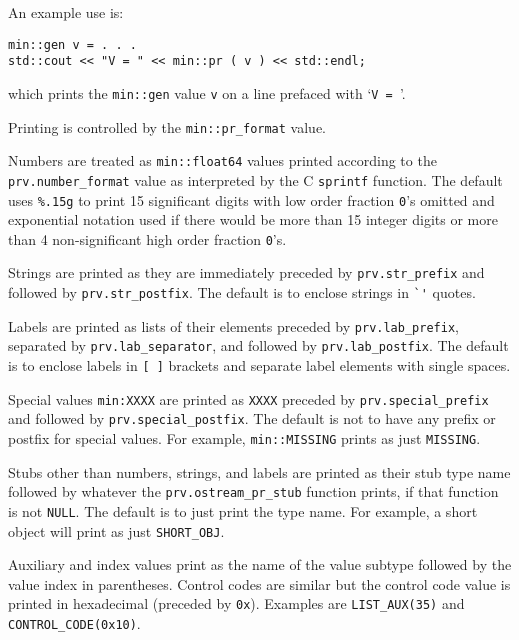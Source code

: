 \documentclass[12pt]{article}
\newcommand{\EOL}{\penalty \exhyphenpenalty}
\newenvironment{indpar}[1][0.3in]%
	{\begin{list}{}%
		     {\setlength{\itemsep}{0in}%
		      \setlength{\topsep}{0in}%
		      \setlength{\parsep}{1ex}%
		      \setlength{\labelwidth}{#1}%
		      \setlength{\leftmargin}{#1}%
		      \addtolength{\leftmargin}{\labelsep}}%
	 \item}%
	{\end{list}}
\begin{document}
An example use is:
\begin{indpar}\begin{verbatim}
min::gen v = . . .
std::cout << "V = " << min::pr ( v ) << std::endl;
\end{verbatim}\end{indpar}\label{PR-EXAMPLE}

which prints the \verb|min::gen| value \verb|v| on a line
prefaced with `\verb|V = |'.

Printing is controlled by the \verb|min::pr_format| value.

Numbers are treated as \verb|min::float64| values printed according
to the {\tt prv.number\_\EOL format} value as interpreted by the
C \verb|sprintf| function.  The default uses \verb|%.15g|
to print 15 significant
digits with low order fraction \verb|0|'s omitted and exponential
notation used if there would be more than 15 integer digits
or more than 4 non-significant high order fraction \verb|0|'s.

Strings are printed as they are immediately preceded by
{\tt prv.str\_\EOL prefix} and followed by
{\tt prv.str\_\EOL postfix}.  The default is to enclose strings in
\verb|`'| quotes.

Labels are printed as lists of their elements preceded by
{\tt prv.lab\_\EOL prefix},
separated by {\tt prv.lab\_\EOL separator},
and followed by {\tt prv.lab\_\EOL postfix}.
The default is to enclose labels in
\verb|[ ]| brackets and separate label elements with single spaces.

Special values \verb|min:XXXX| are printed as \verb|XXXX|
preceded by {\tt prv.special\_\EOL prefix} and followed by
{\tt prv.special\_\EOL postfix}.  The default is not to have any prefix
or postfix for special values.  For example, \verb|min::MISSING| prints
as just \verb|MISSING|.

Stubs other than numbers, strings, and labels
are printed as their stub type name followed by whatever
the {\tt prv.ostream\_\EOL pr\_\EOL stub} function\label{MIN::OSTREAM_PR_STUB}
prints, if that function is
not \verb|NULL|.  The default is to just print the type name.
For example, a short object will print as just \verb|SHORT_OBJ|.

Auxiliary and index values print as the name of the value subtype followed
by the value index in parentheses.  Control codes are similar
but the control code value is printed in hexadecimal (preceded by
\verb|0x|).  Examples are \verb|LIST_AUX(35)| and
\verb|CONTROL_CODE(0x10)|.
\end{document}
